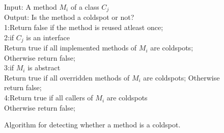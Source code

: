 \documentclass[conference]{IEEEtran}
\newenvironment{CodeOut}{\begin{small}}{\end{small}}
\begin{document}
\begin{figure}[t]
\begin{CodeOut}
Input: A method $M_i$ of a class $C_j$\\
Output: Is the method a coldspot or not?\\
1:Return false if the method is reused atleast once;\\
2:if $C_j$ is an interface \\
\hspace*{0.3in}Return true if all implemented methods of $M_i$ are coldspots; 
\hspace*{0.3in}Otherwise return false; \\
3:if $M_i$ is abstract \\
\hspace*{0.3in}Return true if all overridden methods of $M_i$ are coldspots;
\hspace*{0.3in}Otherwise return false; \\
4:Return true if all callers of $M_i$ are coldspots \\
\hspace*{0.3in}Otherwise return false; \\
\end{CodeOut}
\caption{\label{alg:coldspotalg}Algorithm for detecting whether a method is a coldspot.} 
\end{figure}
\end{document}
